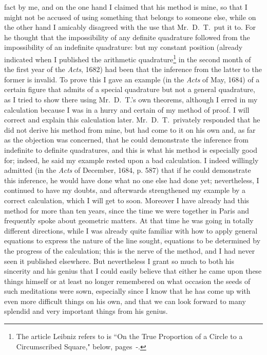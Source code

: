 \documentclass[twoside,openright]{article}
\begin{document}
fact by me, and on the one hand I claimed that his method is mine, so
that I might not be accused of using something that belongs to someone
else, while on the other hand I amicably disagreed with the use that
Mr.\ D.\ T.\ put it to.  For he thought that the impossibility of any
definite quadrature followed from the impossibility of an indefinite
quadrature: but my constant position (already indicated when I
published the arithmetic quadrature\footnote{The article Leibniz
  refers to is ``On the True Proportion of a Circle to a Circumscribed
  Square," below, pages~\pageref{begtp}-\pageref{endtp}.} in the
second month of the first year of the {\em Acts}, 1682) had been that
the inference from the latter to the former is invalid.  To prove this
I gave an example (in the {\em Acts} of May, 1684) of a certain figure
that admits of a special quadrature but not a general quadrature, as I
tried to show there using Mr.\ D.\ T.'s own theorems, although I erred
in my calculation because I was in a hurry and certain of my method of
proof.  I will correct and explain this calculation later.  Mr.\ D.\
T.\ privately responded that he did not derive his method from mine,
but had come to it on his own and, as far as the objection was
concerned, that he could demonstrate the inference from indefinite to
definite quadratures, and this is what his method is especially good
for; indeed, he said my example rested upon a bad calculation.  I
indeed willingly admitted (in the {\em Acts} of December, 1684,
p. 587) that if he could demonstrate this inference, he would have
done what no one else had done yet; nevertheless, I continued to have
my doubts, and afterwards strengthened my example by a correct
calculation, which I will get to soon.  Moreover I have already had
this method for more than ten years, since the time we were together
in Paris and frequently spoke about geometric matters.  At that time
he was going in totally different directions, while I was already
quite familiar with how to apply general equations to express the
nature of the line sought, equations to be determined by the progress
of the calculation; this is the nerve of the method, and I had never
seen it published elsewhere.  But nevertheless I grant so much to both
his sincerity and his genius that I could easily believe that either
he came upon these things himself or at least no longer remembered on
what occasion the seeds of such meditations were sown, especially
since I know that he has come up with even more difficult things on
his own, and that we can look forward to many splendid and very
important things from his genius.
\end{document}
